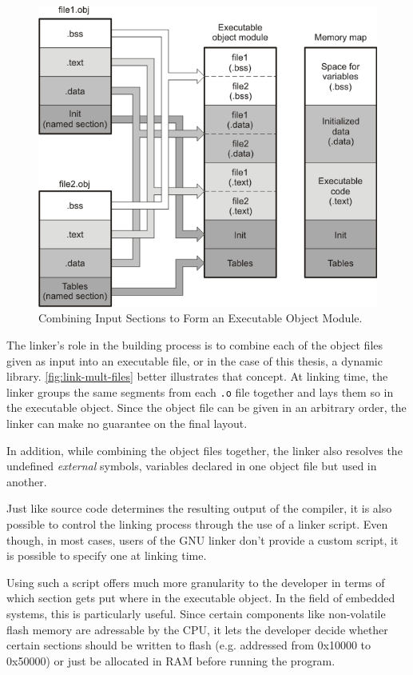 {\begin{figure}[htbp]
	\centering 
	\includegraphics[width=.75\linewidth,keepaspectratio]{art/obj-to-elf-to-mem.png}
	\caption{Combining Input Sections to Form an Executable Object Module.\cite{online:linking}}
	\label{fig:link-mult-files}
\end{figure}

The linker's role in the building process is to combine each of the object files given as input into an executable file, or in the case of this thesis, a dynamic library. \autoref{fig:link-mult-files} better illustrates that concept. At linking time, the linker groups the same segments from each \texttt{.o} file together and lays them so in the executable object. Since the object file can be given in an arbitrary order, the linker can make no guarantee on the final layout.

In addition, while combining the object files together, the linker also resolves the undefined \textit{external} symbols, variables declared in one object file but used in another. 

Just like source code determines the resulting output of the compiler, it is also possible to control the linking process through the use of a linker script\cite{online:ld-scripts}. Even though, in most cases, users of the GNU linker don't provide a custom script, it is possible to specify one at linking time. 

Using such a script offers much more granularity to the developer in terms of which section gets put where in the executable object. In the field of embedded systems, this is particularly useful. Since certain components like non-volatile flash memory are adressable by the CPU, it lets the developer decide whether certain sections should be written to flash (e.g. addressed from 0x10000 to 0x50000) or just be allocated in RAM before running the program.

}
